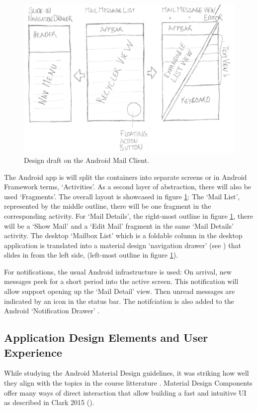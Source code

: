 \documentclass[a4paper,11pt,twoside]{article}
\begin{document}
\begin{figure}
    \includegraphics[width=1\textwidth]{hand_design.png}
    \caption{Design draft on the Android Mail Client.}
    \label{fig:hand_design}
\end{figure}

The Android app is will split the containers into separate screens or
in Android Framework terms, `Activities'. As a second layer of abstraction,
there will also be used `Fragments'. The overall layout is showcased in
figure \ref{fig:hand_design}:   The `Mail List', represented by the middle
outline, there will be one fragment in the corresponding activity. For `Mail Details',
the right-most outline in figure \ref{fig:hand_design}, there will be a `Show Mail' and
a `Edit Mail' fragment in the same `Mail Details' activity. The desktop
`Mailbox List' which is a foldable column in the desktop application is translated
into a material design `navigation drawer' (see \cite{navigation_drawer}) that
slides in from the left side, (left-most outline in figure \ref{fig:hand_design}).

For notifications, the usual Android infrastructure is used: On arrival, new messages
peek for a short period into the active screen. This notification will allow
support opening up the `Mail Detail' view.  Then unread messages are indicated
by an icon in the status bar. The notifciation is also added to the Android
`Notification Drawer' \cite{android_notifications}.

\subsection{Application Design Elements and User Experience}
While studying the Android Material Design guidelines, it was striking how well
they align with the topics in the course litterature \cite{clark2015}. Material
Design Components offer many ways of direct interaction that allow building
a fast and intuitive UI as described in Clark 2015
(\cite[chapter 3, 'Enable primary tasks directly from list view']{clark2015}).
\end{document}
